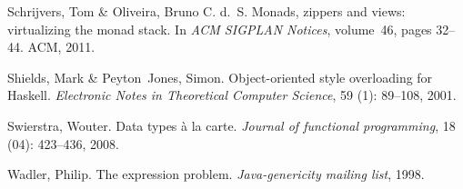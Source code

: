 \documentclass[runningheads,a4paper]{llncs}
\begin{document}
\begin{thebibliography}{4}
Schrijvers, Tom \& Oliveira, Bruno C. d.~S.
\newblock Monads, zippers and views: virtualizing the monad stack.
\newblock In \emph{ACM SIGPLAN Notices}, volume~46, pages 32--44. ACM, 2011.

Shields, Mark \& Peyton~Jones, Simon.
\newblock Object-oriented style overloading for Haskell.
\newblock \emph{Electronic Notes in Theoretical Computer Science}, 59
  (1): 89--108, 2001.

Swierstra, Wouter.
\newblock Data types {\`a} la carte.
\newblock \emph{Journal of functional programming}, 18 (04):
  423--436, 2008.

Wadler, Philip.
\newblock The expression problem.
\newblock \emph{Java-genericity mailing list}, 1998.









\end{thebibliography}
\end{document}

